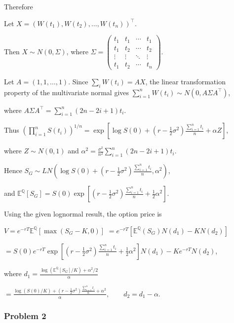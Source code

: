 Therefore

\noindent{}

Let
$X=(W(t_1),W(t_2),\ldots,W(t_n))^\top$.

Then $X\sim N(0,\Sigma)$, where
$\Sigma=\begin{pmatrix}t_1&t_1&\cdots&t_1\\t_1&t_2&\cdots&t_2\\\vdots&\vdots&\ddots&\vdots\\t_1&t_2&\cdots&t_n\end{pmatrix}$.

Let $A=(1,1,\ldots,1)$. Since $\sum_iW(t_i)=AX$, the linear transformation property of the multivariate normal gives
$\sum_{i=1}^nW(t_i)\sim N(0,A\Sigma A^\top)$,

where
$A\Sigma A^\top=\sum_{i=1}^n(2n-2i+1)t_i$.

Thus
$\left(\prod_{i=1}^nS(t_i)\right)^{1/n}=\exp\left[\log S(0)+\left(r-\frac12\sigma^2\right)\frac{\sum_{i=1}^nt_i}{n}+\alpha Z\right]$,

where $Z\sim N(0,1)$ and
$\alpha^2=\frac{\sigma^2}{n^2}\sum_{i=1}^n(2n-2i+1)t_i$.

Hence
$S_G\sim LN\left(\log S(0)+\left(r-\frac12\sigma^2\right)\frac{\sum_{i=1}^nt_i}{n},\alpha^2\right)$,

and
$\mathbb{E}^{\mathbb Q}[S_G]=S(0)\exp\left[\left(r-\frac12\sigma^2\right)\frac{\sum_{i=1}^nt_i}{n}+\frac12\alpha^2\right]$.

Using the given lognormal result, the option price is

$V=e^{-rT}\mathbb{E}^{\mathbb Q}[\max(S_G-K,0)]$
$=e^{-rT}[\mathbb{E}^{\mathbb Q}(S_G)N(d_1)-KN(d_2)]$

$=S(0)e^{-rT}\exp\left[\left(r-\frac12\sigma^2\right)\frac{\sum_{i=1}^nt_i}{n}+\frac12\alpha^2\right]N(d_1)-Ke^{-rT}N(d_2)$,

where
$d_1=\frac{\log(\mathbb{E}^{\mathbb Q}[S_G]/K)+\alpha^2/2}{\alpha}$

$=\frac{\log(S(0)/K)+\left(r-\frac12\sigma^2\right)\frac{\sum_{i=1}^nt_i}{n}+\alpha^2}{\alpha},\qquad d_2=d_1-\alpha$.

\subsubsection*{Problem 2}

